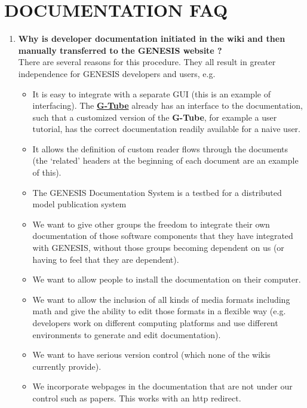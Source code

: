 \documentclass[12pt]{article}
\begin{document}
\section*{DOCUMENTATION FAQ}

\begin{enumerate}

\item {\bf Why is developer documentation initiated in the wiki and then manually transferred to the GENESIS website ?} \\
There are several reasons for this procedure. They all result in greater independence for GENESIS developers and users, e.g.

\begin{itemize}
\item It is easy to integrate with a separate GUI (this is an example of
interfacing).  The \href{../gtube/gtube.tex}{\bf G-Tube} already has an interface to the
documentation, such that a customized version of the {\bf G-Tube}, for example a
user tutorial, has the correct documentation readily available for a
naive user.

\item It allows the definition of custom reader flows through the
documents (the `related' headers at the beginning of each document are an
example of this).

\item The GENESIS Documentation System is a testbed for a distributed model publication system

\item We want to give other groups the freedom to integrate their own
documentation of those software components that they have integrated
with GENESIS, without those groups becoming dependent on us (or having
to feel that they are dependent).

\item We want to allow people to install the documentation on their computer.

\item We want to allow the inclusion of all kinds of media formats
including math and give the ability to edit those formats in a
flexible way (e.g. developers work on different computing platforms and use different
environments to generate and edit documentation).

\item We want to have serious version control (which none of the wikis
currently provide).

\item We incorporate webpages in the documentation that are not under our
control such as papers.  This works with an http redirect.


\end{itemize}
\end{enumerate}
\end{document}
